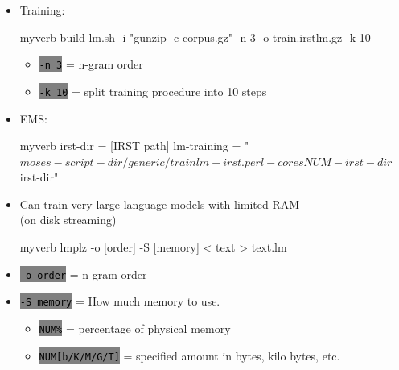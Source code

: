 \documentclass[landscape]{uedslides2C}
\newcommand{\littlecode}[1]{\colorbox{gray}{\textcolor{black}{\small \tt #1}}}
\begin{document}
\begin{itemize}

\item Training: \\[3mm]
\begin{SaveVerbatim}{myverb} 
build-lm.sh -i "gunzip -c corpus.gz" -n 3 
      -o train.irstlm.gz -k 10
\end{SaveVerbatim}
\colorbox{gray}{}

\begin{itemize}
\item \littlecode{-n 3} = n-gram order
\item \littlecode{-k 10} = split training procedure into 10 steps
\end{itemize}

\item EMS:  \\[3mm]
  \begin{SaveVerbatim}{myverb} 
  irst-dir = [IRST path]
  lm-training = "$moses-script-dir/generic/trainlm-irst.perl 
		  -cores NUM -irst-dir $irst-dir"
  \end{SaveVerbatim}
  \colorbox{gray}{}

\end{itemize}

\vspace{5mm}
\begin{itemize}
\item Can train very large language models with limited RAM\\
(on disk streaming)\\[5mm]
\begin{SaveVerbatim}{myverb} 
lmplz -o [order] -S [memory] < text > text.lm
\end{SaveVerbatim}
\colorbox{gray}{}

\item \littlecode{-o order} = n-gram order
\item \littlecode{-S memory} = How much memory to use.
	      \begin{itemize}
		\item \littlecode{NUM\%} = percentage of physical memory \vspace{2mm}
		\item \littlecode{NUM[b/K/M/G/T]} = specified amount in bytes, kilo bytes, etc.
	      \end{itemize}
\end{itemize}
\end{document}
